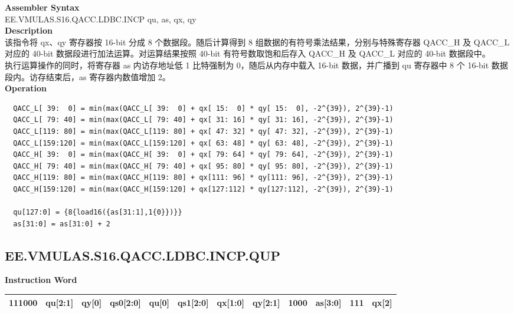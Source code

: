 \textbf{Assembler Syntax} \\
EE.VMULAS.S16.QACC.LDBC.INCP qu, as, qx, qy \\
\textbf{Description} \\
该指令将 qx、qy 寄存器按 16-bit 分成 8 个数据段。随后计算得到 8 组数据的有符号乘法结果，分别与特殊寄存器 QACC\_H 及 QACC\_L 对应的 40-bit 数据段进行加法运算。对运算结果按照 40-bit 有符号数取饱和后存入 QACC\_H 及 QACC\_L 对应的 40-bit 数据段中。\\
执行运算操作的同时，将寄存器 as 内访存地址低 1 比特强制为 0，随后从内存中载入 16-bit 数据，并广播到 qu 寄存器中 8 个 16-bit 数据段内。访存结束后，as 寄存器内数值增加 2。\\
\textbf{Operation}
\begin{lstlisting}
  QACC_L[ 39:  0] = min(max(QACC_L[ 39:  0] + qx[ 15:  0] * qy[ 15:  0], -2^{39}), 2^{39}-1)
  QACC_L[ 79: 40] = min(max(QACC_L[ 79: 40] + qx[ 31: 16] * qy[ 31: 16], -2^{39}), 2^{39}-1)
  QACC_L[119: 80] = min(max(QACC_L[119: 80] + qx[ 47: 32] * qy[ 47: 32], -2^{39}), 2^{39}-1)
  QACC_L[159:120] = min(max(QACC_L[159:120] + qx[ 63: 48] * qy[ 63: 48], -2^{39}), 2^{39}-1)
  QACC_H[ 39:  0] = min(max(QACC_H[ 39:  0] + qx[ 79: 64] * qy[ 79: 64], -2^{39}), 2^{39}-1)
  QACC_H[ 79: 40] = min(max(QACC_H[ 79: 40] + qx[ 95: 80] * qy[ 95: 80], -2^{39}), 2^{39}-1)
  QACC_H[119: 80] = min(max(QACC_H[119: 80] + qx[111: 96] * qy[111: 96], -2^{39}), 2^{39}-1)
  QACC_H[159:120] = min(max(QACC_H[159:120] + qx[127:112] * qy[127:112], -2^{39}), 2^{39}-1)

  qu[127:0] = {8{load16({as[31:1],1{0}})}}
  as[31:0] = as[31:0] + 2
\end{lstlisting}

\clearpage
\subsection{EE.VMULAS.S16.QACC.LDBC.INCP.QUP}\label{instruction:EEVMULASS16QACCLDBCINCPQUP}
\setlength\tabcolsep{6pt}
\textbf{Instruction Word} \\
\begin{tabular}{|c|c|c|c|c|c|c|c|c|c|c|c|}
	\hline
	111000 & qu[2:1] & qy[0] & qs0[2:0] & qu[0] & qs1[2:0] & qx[1:0] & qy[2:1] & 1000 & as[3:0] & 111 & qx[2] \\
	\hline
\end{tabular}

